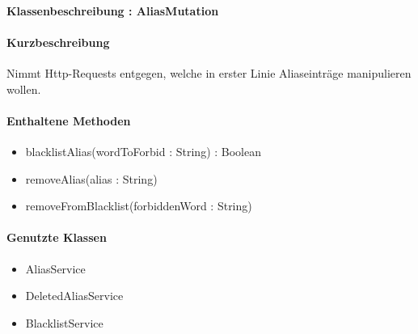 \paragraph{Klassenbeschreibung : AliasMutation}%
\paragraph*{Kurzbeschreibung}
Nimmt Http-Requests entgegen, welche in erster Linie Aliaseinträge manipulieren wollen.
\paragraph*{Enthaltene Methoden}
\begin{itemize}
    \item blacklistAlias(wordToForbid : String) : Boolean
    \item removeAlias(alias : String)
    \item removeFromBlacklist(forbiddenWord : String)
\end{itemize}
\paragraph*{Genutzte Klassen}
\begin{itemize}
    \item AliasService
    \item DeletedAliasService
    \item BlacklistService
\end{itemize}